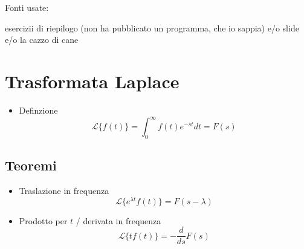 \documentclass[11pt]{article}
\date{\today}
\title{}
\begin{document}
\tableofcontents

Fonti usate: 

esercizii di riepilogo (non ha pubblicato un programma, che io sappia)
e/o slide e/o la cazzo di cane

\section{Trasformata Laplace}
\label{sec:org03f9a32}
\begin{itemize}
\item Definzione
\[\mathcal{L}\{f(t)\} = \int_{0}^{\infty} f(t) e^{-st} dt = F(s)\]
\end{itemize}

\subsection{Teoremi}
\label{sec:orgbac12db}
\begin{itemize}
\item Traslazione in frequenza
\[\mathcal{L}\{e^{\lambda t}f(t)\} = F(s-\lambda)\]
\item Prodotto per \(t\) / derivata in frequenza
\[\mathcal{L}\{t f(t)\} = -\frac{d}{ds} F(s)\]
\end{itemize}
\end{document}
